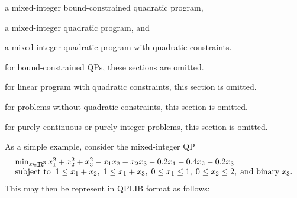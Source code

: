 \begin{description}
\begin{description}
\begin{description}[leftmargin=!,labelwidth=\widthof{\ttfamily SMILQPC}]
\item [MIBQP]   a mixed-integer bound-constrained quadratic program,
\item [MIQP]    a mixed-integer quadratic program, and
\item [MIQPQC]  a mixed-integer quadratic program with quadratic constraints.
\end{description}
\end{description}


\item [{[2]}]
for bound-constrained QPs, these sections are omitted.
\item [{[3]}]
for linear program with quadratic constraints, this section is omitted.
\item [{[4]}]
for problems without quadratic constraints, this section is omitted.
\item [{[5]}]
for purely-continuous or purely-integer problems, this section is omitted.
\end{description}

As a simple example, consider the mixed-integer QP
\[\arr{l}{\min_{x \in \smallRe^3} x_1^2 + x_2^2 + x_3^2 - x_1 x_2 - x_2 x_3
  - 0.2 x_1  -0.4 x_2 - 0.2 x_3 \\
\st 1 \leq x_1 + x_2, \; 1 \leq x_1 + x_3, \; 0 \leq x_1 \leq 1,
\; 0 \leq x_2 \leq 2, \; \mbox{and binary} \; x_3.}
\]
This may then be represent in QPLIB format as follows:

